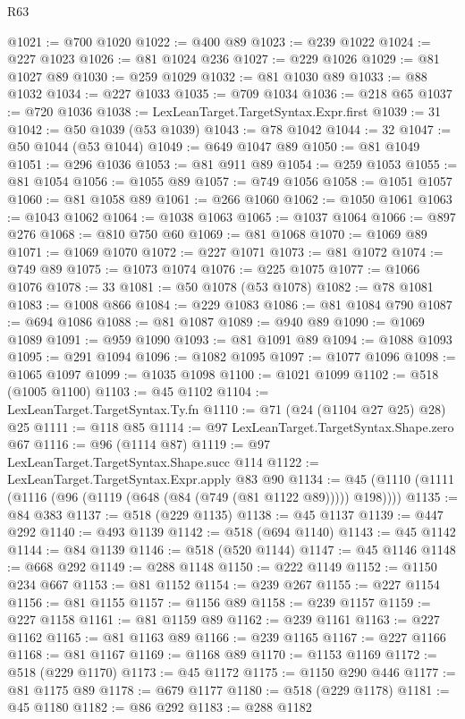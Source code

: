 \begin{lexlean}{R63}
\begin{coremodule}
@1021 := @700 @1020
@1022 := @400 @89
@1023 := @239 @1022
@1024 := @227 @1023
@1026 := @81 @1024 @236
@1027 := @229 @1026
@1029 := @81 @1027 @89
@1030 := @259 @1029
@1032 := @81 @1030 @89
@1033 := @88 @1032
@1034 := @227 @1033
@1035 := @709 @1034
@1036 := @218 @65
@1037 := @720 @1036
@1038 := LexLeanTarget.TargetSyntax.Expr.first
@1039 := 31
@1042 := @50 @1039 (@53 @1039)
@1043 := @78 @1042
@1044 := 32
@1047 := @50 @1044 (@53 @1044)
@1049 := @649 @1047 @89
@1050 := @81 @1049
@1051 := @296 @1036
@1053 := @81 @911 @89
@1054 := @259 @1053
@1055 := @81 @1054
@1056 := @1055 @89
@1057 := @749 @1056
@1058 := @1051 @1057
@1060 := @81 @1058 @89
@1061 := @266 @1060
@1062 := @1050 @1061
@1063 := @1043 @1062
@1064 := @1038 @1063
@1065 := @1037 @1064
@1066 := @897 @276
@1068 := @810 @750 @60
@1069 := @81 @1068
@1070 := @1069 @89
@1071 := @1069 @1070
@1072 := @227 @1071
@1073 := @81 @1072
@1074 := @749 @89
@1075 := @1073 @1074
@1076 := @225 @1075
@1077 := @1066 @1076
@1078 := 33
@1081 := @50 @1078 (@53 @1078)
@1082 := @78 @1081
@1083 := @1008 @866
@1084 := @229 @1083
@1086 := @81 @1084 @790
@1087 := @694 @1086
@1088 := @81 @1087
@1089 := @940 @89
@1090 := @1069 @1089
@1091 := @959 @1090
@1093 := @81 @1091 @89
@1094 := @1088 @1093
@1095 := @291 @1094
@1096 := @1082 @1095
@1097 := @1077 @1096
@1098 := @1065 @1097
@1099 := @1035 @1098
@1100 := @1021 @1099
@1102 := @518 (@1005 @1100)
@1103 := @45 @1102
@1104 := LexLeanTarget.TargetSyntax.Ty.fn
@1110 := @71 (@24 (@1104 @27 @25) @28) @25
@1111 := @118 @85
@1114 := @97 LexLeanTarget.TargetSyntax.Shape.zero @67
@1116 := @96 (@1114 @87)
@1119 := @97 LexLeanTarget.TargetSyntax.Shape.succ @114
@1122 := LexLeanTarget.TargetSyntax.Expr.apply @83 @90
@1134 := @45 (@1110 (@1111 (@1116 (@96 (@1119 (@648 (@84 (@749 (@81 @1122 @89))))) @198))))
@1135 := @84 @383
@1137 := @518 (@229 @1135)
@1138 := @45 @1137
@1139 := @447 @292
@1140 := @493 @1139
@1142 := @518 (@694 @1140)
@1143 := @45 @1142
@1144 := @84 @1139
@1146 := @518 (@520 @1144)
@1147 := @45 @1146
@1148 := @668 @292
@1149 := @288 @1148
@1150 := @222 @1149
@1152 := @1150 @234 @667
@1153 := @81 @1152
@1154 := @239 @267
@1155 := @227 @1154
@1156 := @81 @1155
@1157 := @1156 @89
@1158 := @239 @1157
@1159 := @227 @1158
@1161 := @81 @1159 @89
@1162 := @239 @1161
@1163 := @227 @1162
@1165 := @81 @1163 @89
@1166 := @239 @1165
@1167 := @227 @1166
@1168 := @81 @1167
@1169 := @1168 @89
@1170 := @1153 @1169
@1172 := @518 (@229 @1170)
@1173 := @45 @1172
@1175 := @1150 @290 @446
@1177 := @81 @1175 @89
@1178 := @679 @1177
@1180 := @518 (@229 @1178)
@1181 := @45 @1180
@1182 := @86 @292
@1183 := @288 @1182

\end{coremodule}
\end{lexlean}
